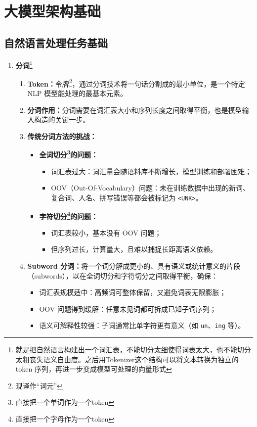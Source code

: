 \documentclass[../main.tex]{subfiles}
\begin{document}
\section{大模型架构基础}\label{sec:llm-architecture}
\subsection{自然语言处理任务基础}
\begin{enumerate}
    \item \textbf{分词}\footnote{就是把自然语言构建出一个词汇表，不能切分太细使得词表太大，也不能切分太粗丧失语义自由度。之后用Tokenizer这个结构可以将文本转换为独立的 token 序列，再进一步变成模型可处理的向量形式}
    \begin{enumerate}
        \item \textbf{Token：}令牌\footnote{现译作“词元”}，通过分词技术将一句话分割成的最小单位，是一个特定 NLP 模型能处理的最基本元素。
        
        \item \textbf{分词作用：}分词需要在词汇表大小和序列长度之间取得平衡，也是模型输入构造的关键一步。

        \item \textbf{传统分词方法的挑战：}
        \begin{itemize}
            \item \textbf{全词切分\footnote{直接把一个单词作为一个token}的问题：}
            {\small\kaishu
            \begin{itemize}
                \item 词汇表过大：词汇量会随语料库不断增长，模型训练和部署困难；
                \item OOV（Out-Of-Vocabulary）问题：未在训练数据中出现的新词、复合词、人名、拼写错误等都会被标记为 \texttt{<UNK>}。
            \end{itemize}
            }
            \item \textbf{字符切分\footnote{直接把一个字母作为一个token}的问题：}
            {\small\kaishu
            \begin{itemize}
                \item 词汇表较小，基本没有 OOV 问题；
                \item 但序列过长，计算量大，且难以捕捉长距离语义依赖。
            \end{itemize}
            }
        \end{itemize}

        \item \textbf{Subword 分词：}将一个词分解成更小的、具有语义或统计意义的片段（subwords），以在全词切分和字符切分之间取得平衡，确保：
        {\small\kaishu
        \begin{itemize}
            \item 词汇表规模适中：高频词可整体保留，又避免词表无限膨胀；
            \item OOV 问题得到缓解：任意未见词都可拆成已知子词序列；
            \item 语义可解释性较强：子词通常比单字符更有意义（如 \texttt{un}、\texttt{ing} 等）。
        \end{itemize}
        }
        

\end{enumerate}
\end{enumerate}
\end{document}
